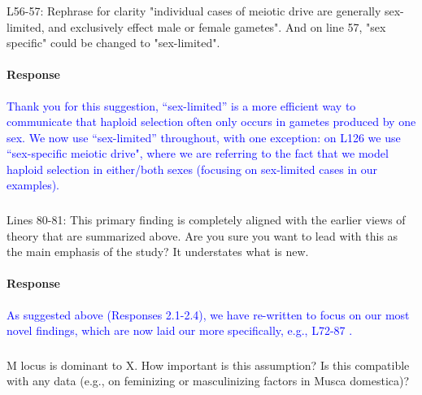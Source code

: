 \documentclass[10pt,letterpaper]{article}
\begin{document}
\noindent\subsubsection{}
L56-57: Rephrase for clarity "individual cases of meiotic drive are generally sex-limited, and exclusively effect male or female gametes". And on line 57, "sex specific" could be changed to "sex-limited".

\noindent\paragraph{Response}
\textcolor{blue}{
Thank you for this suggestion, ``sex-limited'' is a more efficient way to communicate that haploid selection often only occurs in gametes produced by one sex. 
We now use ``sex-limited'' throughout, with one exception: on L126 we use ``sex-specific meiotic drive", where we are referring to the fact that we model haploid selection in either/both sexes (focusing on sex-limited cases in our examples). 
}

\noindent\subsubsection{}
Lines 80-81: This primary finding is completely aligned with the earlier views of theory that are summarized above. Are you sure you want to lead with this as the main emphasis of the study? It understates what is new.

\noindent\paragraph{Response}
\textcolor{blue}{
As suggested above (Responses 2.1-2.4), we have re-written to focus on our most novel findings, which are now laid our more specifically, e.g., L72-87 . 
}

\noindent\subsubsection{}
M locus is dominant to X. How important is this assumption? Is this compatible with any data (e.g., on feminizing or masculinizing factors in Musca domestica)?
\end{document}
